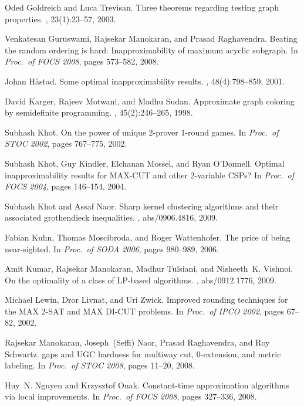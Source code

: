 \documentclass[letterpaper, 11pt]{article}
\begin{document}
\begin{thebibliography}{10}
Oded Goldreich and Luca Trevisan.
\newblock Three theorems regarding testing graph properties.
, 23(1):23--57, 2003.

Venkatesan Guruswami, Rajsekar Manokaran, and Prasad Raghavendra.
\newblock Beating the random ordering is hard: Inapproximability of maximum
  acyclic subgraph.
\newblock In {\em Proc.~of FOCS 2008}, pages 573--582, 2008.

Johan H{\aa}stad.
\newblock Some optimal inapproximability results.
, 48(4):798--859, 2001.

David Karger, Rajeev Motwani, and Madhu Sudan.
\newblock Approximate graph coloring by semidefinite programming.
, 45(2):246--265, 1998.

Subhash Khot.
\newblock On the power of unique 2-prover 1-round games.
\newblock In {\em Proc.~of STOC 2002}, pages 767--775, 2002.

Subhash Khot, Guy Kindler, Elchanan Mossel, and Ryan O'Donnell.
\newblock Optimal inapproximability results for {MAX}-{CUT} and other
  2-variable {CSPs}?
\newblock In {\em Proc.~of FOCS 2004}, pages 146--154, 2004.

Subhash Khot and Assaf Naor.
\newblock Sharp kernel clustering algorithms and their associated grothendieck
  inequalities.
, abs/0906.4816, 2009.

Fabian Kuhn, Thomas Moscibroda, and Roger Wattenhofer.
\newblock The price of being near-sighted.
\newblock In {\em Proc.~of SODA 2006}, pages 980--989, 2006.

Amit Kumar, Rajsekar Manokaran, Madhur Tulsiani, and Nisheeth~K. Vishnoi.
\newblock On the optimality of a class of {LP}-based algorithms.
, abs/0912.1776, 2009.

Michael Lewin, Dror Livnat, and Uri Zwick.
\newblock Improved rounding techniques for the {MAX} 2-{SAT} and {MAX}
  {DI}-{CUT} problems.
\newblock In {\em Proc.~of IPCO 2002}, pages 67--82, 2002.

Rajsekar Manokaran, Joseph~(Seffi) Naor, Prasad Raghavendra, and Roy Schwartz.
 gaps and {UGC} hardness for multiway cut, 0-extension, and
  metric labeling.
\newblock In {\em Proc.~of STOC 2008}, pages 11--20, 2008.

Huy~N. Nguyen and Krzysztof Onak.
\newblock Constant-time approximation algorithms via local improvements.
\newblock In {\em Proc.~of FOCS 2008}, pages 327--336, 2008.


\end{thebibliography}
\end{document}
